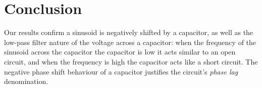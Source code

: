\section{Conclusion}\label{sec:conclusion}
Our results confirm a sinusoid is negatively shifted by a capacitor, as well as the low-pass filter nature of the voltage across a capacitor: when the frequency of the sinusoid across the capacitor the capacitor is low it acts similar to an open circuit, and when the frequency is high the capacitor acts like a short circuit.
The negative phase shift behaviour of a capacitor justifies the circuit's \textit{phase lag} denomination.
